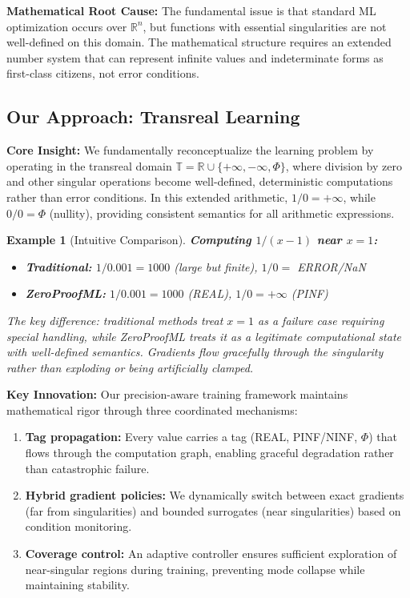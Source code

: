\documentclass[twoside,11pt]{article}
\newtheorem{examplebox}{Example}[section]
\newcommand{\trReal}{\textsc{REAL}}
\newcommand{\trPINF}{\textsc{PINF}}
\newcommand{\trNINF}{\textsc{NINF}}
\newcommand{\trPHI}{\textsc{$\Phi$}}
\newcommand{\TAGREAL}{\trReal}
\newcommand{\TAGPINF}{\trPINF}
\newcommand{\TAGNINF}{\trNINF}
\newcommand{\TAGPHI}{\trPHI}
\begin{document}
\textbf{Mathematical Root Cause:} The fundamental issue is that standard ML optimization occurs over $\mathbb{R}^n$, but functions with essential singularities are not well-defined on this domain. The mathematical structure requires an extended number system that can represent infinite values and indeterminate forms as first-class citizens, not error conditions.
\subsection{Our Approach: Transreal Learning}
\textbf{Core Insight:} We fundamentally reconceptualize the learning problem by operating in the transreal domain $\mathbb{T} = \mathbb{R} \cup \{+\infty, -\infty, \Phi\}$, where division by zero and other singular operations become well-defined, deterministic computations rather than error conditions. In this extended arithmetic, $1/0 = +\infty$, while $0/0 = \Phi$ (nullity), providing consistent semantics for all arithmetic expressions.

\begin{examplebox}[Intuitive Comparison]
\textbf{Computing $1/(x-1)$ near $x=1$:}
\begin{itemize}
\item \textbf{Traditional:} $1/0.001 = 1000$ (large but finite), $1/0 = $ ERROR/NaN
\item \textbf{ZeroProofML:} $1/0.001 = 1000$ (\TAGREAL), $1/0 = +\infty$ (\TAGPINF)
\end{itemize}
The key difference: traditional methods treat $x=1$ as a failure case requiring special handling, while ZeroProofML treats it as a legitimate computational state with well-defined semantics. Gradients flow gracefully through the singularity rather than exploding or being artificially clamped.
\end{examplebox}

\textbf{Key Innovation:} Our precision-aware training framework maintains mathematical rigor through three coordinated mechanisms:
\begin{enumerate}
\item \textbf{Tag propagation:} Every value carries a tag (\TAGREAL, \TAGPINF/\TAGNINF, \TAGPHI) that flows through the computation graph, enabling graceful degradation rather than catastrophic failure.
\item \textbf{Hybrid gradient policies:} We dynamically switch between exact gradients (far from singularities) and bounded surrogates (near singularities) based on condition monitoring.
\item \textbf{Coverage control:} An adaptive controller ensures sufficient exploration of near-singular regions during training, preventing mode collapse while maintaining stability.
\end{enumerate}
\end{document}
